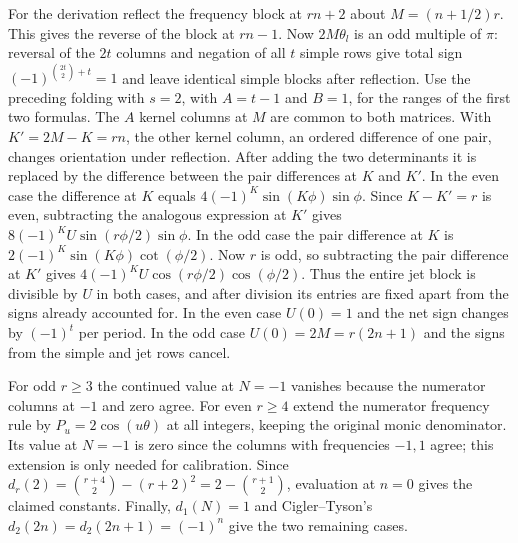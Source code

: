 \documentclass[11pt,a4paper]{article}
\begin{document}
For the derivation reflect the frequency block at $rn+2$ about $M=(n+1/2)r$. This gives the reverse of the block at $rn-1$. Now $2M\theta_l$ is an odd multiple of $\pi$: reversal of the $2t$ columns and negation of all $t$ simple rows give total sign $(-1)^{\binom{2t}{2}+t}=1$ and leave identical simple blocks after reflection. Use the preceding folding with $s=2$, with $A=t-1$ and $B=1$, for the ranges of the first two formulas. The $A$ kernel columns at $M$ are common to both matrices. With $K'=2M-K=rn$, the other kernel column, an ordered difference of one pair, changes orientation under reflection. After adding the two determinants it is replaced by the difference between the pair differences at $K$ and $K'$. In the even case the difference at $K$ equals $4(-1)^K\sin(K\phi)\sin\phi$. Since $K-K'=r$ is even, subtracting the analogous expression at $K'$ gives
$8(-1)^K U\sin(r\phi/2)\sin\phi$. In the odd case the pair difference at $K$ is $2(-1)^K\sin(K\phi)\cot(\phi/2)$. Now $r$ is odd, so subtracting the pair difference at $K'$ gives
$4(-1)^K U\cos(r\phi/2)\cos(\phi/2)$.
Thus the entire jet block is divisible by $U$ in both cases, and after division its entries are fixed apart from the signs already accounted for. In the even case $U(0)=1$ and the net sign changes by $(-1)^t$ per period. In the odd case $U(0)=2M=r(2n+1)$ and the signs from the simple and jet rows cancel.

For odd $r\ge3$ the continued value at $N=-1$ vanishes because the numerator columns at $-1$ and zero agree. For even $r\ge4$ extend the numerator frequency rule by $P_u=2\cos(u\theta)$ at all integers, keeping the original monic denominator. Its value at $N=-1$ is zero since the columns with frequencies $-1,1$ agree; this extension is only needed for calibration. Since $d_r(2)=\binom{r+4}2-(r+2)^2=2-\binom{r+1}2$, evaluation at $n=0$ gives the claimed constants. Finally, $d_1(N)=1$ and Cigler--Tyson's $d_2(2n)=d_2(2n+1)=(-1)^n$ give the two remaining cases.
\end{document}

